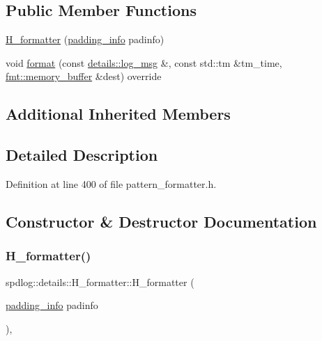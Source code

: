 \subsection*{Public Member Functions}
\begin{DoxyCompactItemize}
\item 
\hyperlink{classspdlog_1_1details_1_1_h__formatter_a4cbf3915e24d7588af53b06a1233ea56}{H\+\_\+formatter} (\hyperlink{structspdlog_1_1details_1_1padding__info}{padding\+\_\+info} padinfo)
\item 
void \hyperlink{classspdlog_1_1details_1_1_h__formatter_a46e166ed26e90bfe5bbc6b5f83040bef}{format} (const \hyperlink{structspdlog_1_1details_1_1log__msg}{details\+::log\+\_\+msg} \&, const std\+::tm \&tm\+\_\+time, \hyperlink{format_8h_a21cbf729f69302f578e6db21c5e9e0d2}{fmt\+::memory\+\_\+buffer} \&dest) override
\end{DoxyCompactItemize}
\subsection*{Additional Inherited Members}


\subsection{Detailed Description}


Definition at line 400 of file pattern\+\_\+formatter.\+h.



\subsection{Constructor \& Destructor Documentation}
\mbox{\label{classspdlog_1_1details_1_1_h__formatter_a4cbf3915e24d7588af53b06a1233ea56}} 
\subsubsection{\texorpdfstring{H\+\_\+formatter()}{H\_formatter()}}
{\footnotesize\ttfamily spdlog\+::details\+::\+H\+\_\+formatter\+::\+H\+\_\+formatter (\begin{DoxyParamCaption}\item[{\hyperlink{structspdlog_1_1details_1_1padding__info}{padding\+\_\+info}}]{padinfo }\end{DoxyParamCaption})\hspace{0.3cm}{\ttfamily [inline]}, {\ttfamily [explicit]}}



